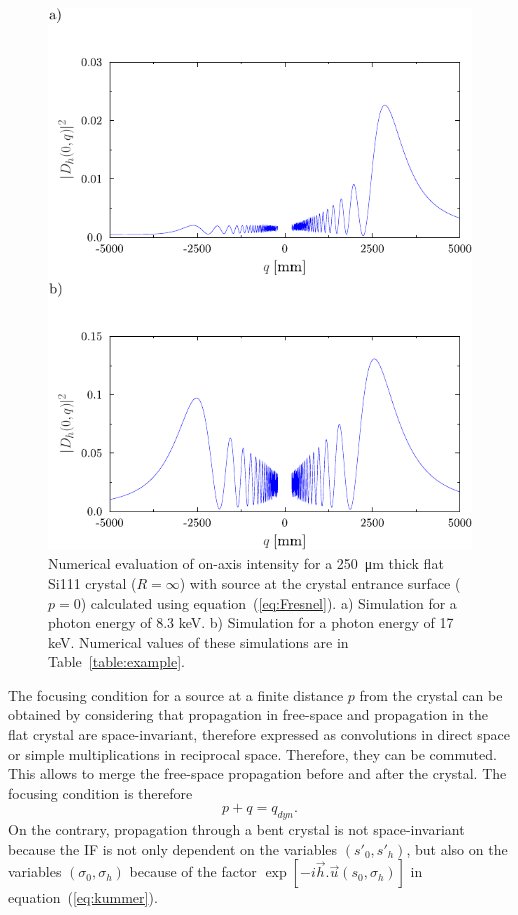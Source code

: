 \documentclass[preprint]{iucr}              %
\begin{document}
\begin{figure}
\label{fig:flatLaue}
\caption{Numerical evaluation of on-axis intensity for a  \SI{250}{\micro\meter} thick flat Si111 crystal ($R=\infty$) with source at the crystal entrance surface ($p=0$) calculated using equation~(\ref{eq:Fresnel}).
a) Simulation for a photon energy of 8.3 keV.
b) Simulation for a photon energy of 17 keV.
Numerical values of these simulations are in Table~\ref{table:example}.
}
\includegraphics[width=1\textwidth]{fig4.pdf}
\end{figure}

The focusing condition for a source at a finite distance $p$ from the crystal can be obtained by considering that propagation in free-space and propagation in the flat crystal are space-invariant, therefore expressed as convolutions in direct space or simple multiplications in reciprocal space. Therefore, they can be commuted. This allows to merge the free-space propagation before and after the crystal. The focusing condition is therefore
\begin{equation}
    p + q = q_{dyn}.
\end{equation}
On the contrary, propagation through a bent crystal is not space-invariant because the IF is not only dependent on the variables $(s'_0, s'_h)$, but also on the variables $(\sigma_0, \sigma_h)$ because of the factor  
$\exp[-i \vec h . \vec u (s_0, \sigma_h)]$ in 
equation~(\ref{eq:kummer}). 
\end{document}
